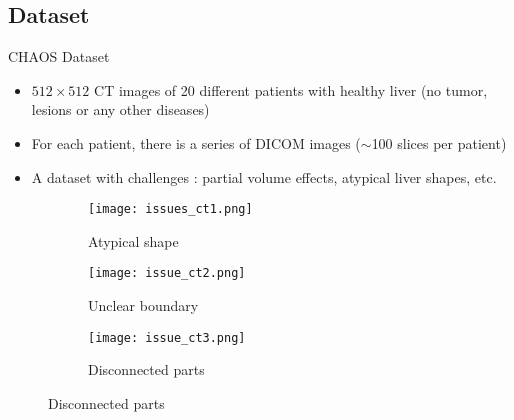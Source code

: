 \subsection{Dataset}
\begin{frame}{CHAOS Dataset}
    \begin{itemize}
        \item $512 \times 512 $ CT images of 20 different patients with healthy liver (no tumor, lesions or any other diseases)
        \item For each patient, there is a series of DICOM images ($\sim$100 slices per patient)
        \item A dataset with challenges : partial volume effects, atypical liver shapes, etc.
    \end{itemize}

    \begin{figure}[H]
        \begin{subfigure}{.3\textwidth}
            \centering
            \texttt{[image: issues\_ct1.png]}
            \caption{Atypical shape}
        \end{subfigure}
        \begin{subfigure}{.3\textwidth}
            \centering
            \texttt{[image: issue\_ct2.png]}
            \caption{Unclear boundary}
        \end{subfigure}
        \begin{subfigure}{.3\textwidth}
            \centering
            \texttt{[image: issue\_ct3.png]}
            \caption{Disconnected parts}
        \end{subfigure}
    \end{figure}
\end{frame}

